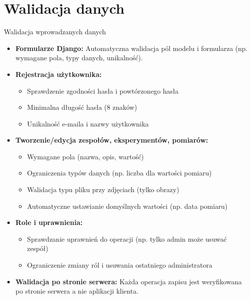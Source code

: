 \documentclass[polish,aspectratio=1610]{beamer}
\begin{document}
    \section{Walidacja danych}
    \begin{frame}{Walidacja wprowadzanych danych}
        \begin{itemize}
            \item \textbf{Formularze Django:} Automatyczna walidacja pól modelu i formularza (np. wymagane pola, typy danych, unikalność).
            \item \textbf{Rejestracja użytkownika:}
            \begin{itemize}
                \item Sprawdzenie zgodności hasła i powtórzonego hasła
                \item Minimalna długość hasła (8 znaków)
                \item Unikalność e-maila i nazwy użytkownika
            \end{itemize}
            \item \textbf{Tworzenie/edycja zespołów, eksperymentów, pomiarów:}
            \begin{itemize}
                \item Wymagane pola (nazwa, opis, wartość)
                \item Ograniczenia typów danych (np. liczba dla wartości pomiaru)
                \item Walidacja typu pliku przy zdjęciach (tylko obrazy)
                \item Automatyczne ustawianie domyślnych wartości (np. data pomiaru)
            \end{itemize}
            \item \textbf{Role i uprawnienia:}
            \begin{itemize}
                \item Sprawdzanie uprawnień do operacji (np. tylko admin może usuwać zespół)
                \item Ograniczenie zmiany ról i usuwania ostatniego administratora
            \end{itemize}
            \item \textbf{Walidacja po stronie serwera:} Każda operacja zapisu jest weryfikowana po stronie serwera a nie aplikacji klienta.
        \end{itemize}
    \end{frame}
\end{document}
